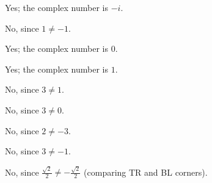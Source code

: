 \documentclass[../key.tex]{subfiles}
\begin{document}
Yes; the complex number is $-i$.

\begin{iinner_problem}
\item {}
\end{iinner_problem}

No, since $1\neq -1$.

\begin{iinner_problem}
\item {}
\end{iinner_problem}

Yes; the complex number is $0$.

\begin{iinner_problem}
\item {}
\end{iinner_problem}

Yes; the complex number is $1$.

\begin{iinner_problem}
\item {}
\end{iinner_problem}

No, since $3\neq 1$.

\begin{iinner_problem}
\item {}
\end{iinner_problem}

No, since $3\neq 0$.

\begin{iinner_problem}
\item {}
\end{iinner_problem}

No, since $2\neq -3$.

\begin{iinner_problem}
\item {}
\end{iinner_problem}

No, since $3\neq -1$.

\begin{iinner_problem}
\item {}
\end{iinner_problem}

No, since $\frac{\sqrt{2}}{2} \neq -\frac{\sqrt{2}}{2}$ (comparing TR and BL corners).

\begin{iinner_problem}
\item {}
\end{iinner_problem}
\end{document}
